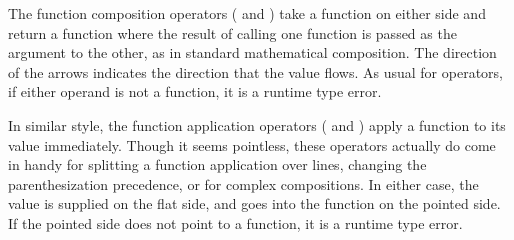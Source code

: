 The function composition operators (\op{<<} and \op{>>}) take a function on either
side and return a function where the result of calling one function is passed as the
argument to the other, as in standard mathematical composition. The direction of
the arrows indicates the direction that the value flows. As usual for operators,
if either operand is not a function, it is a runtime type error.

\begin{prooftree}
\end{prooftree}

\begin{prooftree}
\end{prooftree}

In similar style, the function application operators (\op{<|} and \op{|>}) apply
a function to its value immediately. Though it seems pointless, these operators
actually do come in handy for splitting a function application over lines, changing
the parenthesization precedence, or for complex compositions. In either case, the
value is supplied on the flat side, and goes into the function on the pointed side.
If the pointed side does not point to a function, it is a runtime type error.

\begin{prooftree}
\end{prooftree}

\begin{prooftree}
\end{prooftree}
